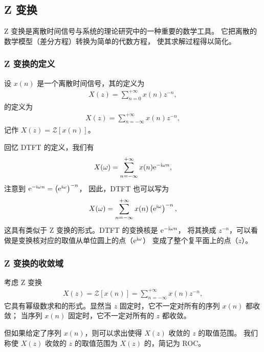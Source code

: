 \subsection{Z 变换}

Z 变换是离散时间信号与系统的理论研究中的一种重要的数学工具。
它把离散的数学模型（差分方程）转换为简单的代数方程，
使其求解过程得以简化。

\subsubsection{Z 变换的定义}

\begin{definition}[Z 变换的定义]
    设 $x(n)$ 是一个离散时间信号，其的定义为
    \begin{align*}
        X(z) = \sum_{n = 0}^{+\infty} x(n) z^{-n},
    \end{align*}
    的定义为
    \begin{align*}
        X(z) = \sum_{n=-\infty}^{+\infty} x(n) z^{-n},
    \end{align*}
    记作 $X(z) = \mathcal{Z}[x(n)]$。
\end{definition}

\begin{remark}
    回忆 DTFT 的定义，我们有
    \begin{align*}
        X(\omega) = \sum_{n=-\infty}^{+\infty} x(n) \mathrm{e}^{-\mathrm{i}\omega n},
    \end{align*}
    注意到 $\mathrm{e}^{-\mathrm{i}\omega n} = \left(\mathrm{e}^{\mathrm{i}\omega}\right)^{-n}$，
    因此，DTFT 也可以写为
    \begin{align*}
        X(\omega) = \sum_{n=-\infty}^{+\infty} x(n) \left(\mathrm{e}^{\mathrm{i}\omega}\right)^{-n},
    \end{align*}
    这具有类似于 Z 变换的形式。DTFT 的变换核是 $\mathrm{e}^{-\mathrm{i}\omega n}$，
    将其换成 $z^{-n}$，可以看做是变换核对应的取值从单位圆上的点（$\mathrm{e}^{\mathrm{i}\omega}$）
    变成了整个复平面上的点（$z$）。
\end{remark}

\subsubsection{Z 变换的收敛域}

\begin{definition}[Z 变换的收敛域]
    考虑 Z 变换
    \begin{align*}
        X(z) = \mathcal{Z}[x(n)] = \sum_{n=-\infty}^{+\infty} x(n) z^{-n},
    \end{align*}
    它具有幂级数求和的形式。显然当 $z$ 固定时，它不一定对所有的序列 $x(n)$ 都收敛；
    当序列 $x(n)$ 固定时，它不一定对所有的 $z$ 都收敛。

    但如果给定了序列 $x(n)$，则可以求出使得 $X(z)$ 收敛的 $z$ 的取值范围。
    我们称使 $X(z)$ 收敛的 $z$ 的取值范围为 $X(z)$ 的，简记为 ROC。
\end{definition}

